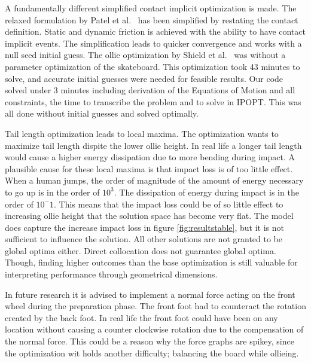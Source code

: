 \documentclass[default,iicol]{sn-jnl}
\begin{document}
A fundamentally different simplified contact implicit optimization is made. The relaxed formulation by Patel et al.~\cite{patel_contact-implicit_2019} has been simplified by restating the contact definition. Static and dynamic friction is achieved with the ability to have contact implicit events. The simplification leads to quicker convergence and works with a null seed initial guess. The ollie optimization by Shield et al.~\cite{shield_contact-implicit_2022} was without a parameter optimization of the skateboard. This optimization took 43 minutes to solve, and accurate initial guesses were needed for feasible results. Our code solved under 3 minutes including derivation of the Equations of Motion and all constraints, the time to transcribe the problem and to solve in IPOPT. This was all done without initial guesses and solved optimally.



Tail length optimization leads to local maxima. The optimization wants to maximize tail length dispite the lower ollie height. In real life a longer tail length would cause a higher energy dissipation due to more bending during impact. A plausible cause for these local maxima is that impact loss is of too little effect. When a human jumps, the order of magnitude of the amount of energy necessary to go up is in the order of $10^3$. The dissipation of energy during impact is in the order of $10^-1$. This means that the impact loss could be of so little effect to increasing ollie height that the solution space has become very flat. The model does capture the increase impact loss in figure \ref{fig:resultstable}, but it is not sufficient to influence the solution. All other solutions are not granted to be global optima either. Direct collocation does not guarantee global optima. Though, finding higher outcomes than the base optimization is still valuable for interpreting performance through geometrical dimensions.

In future research it is advised to implement a normal force acting on the front wheel during the preparation phase. The front foot had to counteract the rotation created by the back foot. In real life the front foot could have been on any location without causing a counter clockwise rotation due to the compensation of the normal force. This could be a reason why the force graphs are spikey, since the optimization wit holds another difficulty; balancing the board while ollieing.
 
\end{document}
